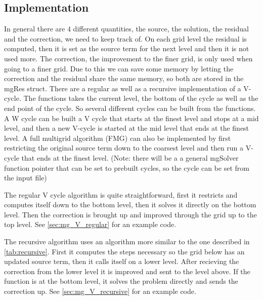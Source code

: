 		\subsection{Implementation}
			In general there are \(4\) different quantities, the source, the solution, the residual and the correction, we need to keep track of.
			On each grid level the residual is computed, then it is set as the source term for the next level and then it is not used more.
			The correction, the improvement to the finer grid, is only used when going to a finer grid. Due to this we can save some memory by
			letting the correction and the residual share the same memory, so both are stored in the mgRes struct. There are a regular as well as a recursive implementation
			of a V-cycle. The functions takes the current level, the bottom of the cycle as well as the end point of the cycle. So several different cycles
			can be built from the functions. A W cycle can be built a V cycle that starts at the finest level and stops at a mid level, and then a new V-cycle is started at
			the mid level that ends at the finest level. A full multigrid algorithm (FMG) can also be implemented by first restricting the original source term down to the coarsest
			level and then run a V-cycle that ends at the finest level.
			(Note: there will be a a general mgSolver function pointer that can be set to prebuilt cycles, so the cycle can be set from the input file)

			The regular V cycle algorithm is quite straightforward, first it restricts and computes itself down to the bottom level,
			then it solves it directly on the bottom level. Then the correction is brought up and improved through the grid up to the top level.
			See \cref{sec:mg_V_regular} for an example code.

			The recursive algorithm uses an algorithm more similar to the one described in \cref{tab:recursive}. First it computes the steps necessary
			so the grid below has an updated source term, then it calls itself on a lower level. After recieving the correction from
			the lower level it is improved and sent to the level above. If the function is at the bottom level, it solves the problem directly and sends
			the correction up. See \cref{sec:mg_V_recursive} for an example code.

